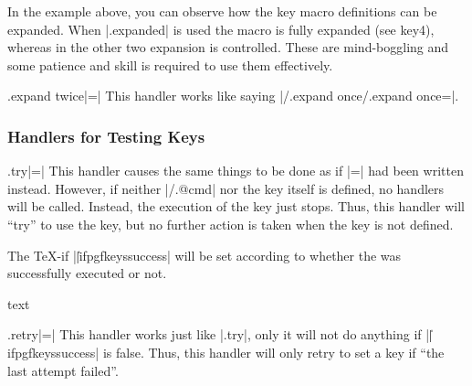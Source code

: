 In the example above, you can observe how the key macro definitions can be expanded. When |.expanded| is used
the macro is fully expanded (see key4), whereas in the other two expansion is controlled. These are mind-boggling and some patience and skill is required to use them effectively.


\begin{handler}{.expand twice}{|=|}
  This handler works like saying |/.expand once/.expand once=|.
\end{handler}





\subsubsection{Handlers for Testing Keys}

\begin{handler}{.try}{|=|}
  This handler causes the same things to be done as if
  |=| had been written instead. However, if
  neither |/.@cmd| nor the key itself is defined, no
  handlers will be called. Instead, 
  the execution of the key just stops. Thus, this handler will ``try''
  to use the key, but no further action is taken when the key is not
  defined.

  The \TeX-if |\||ifpgfkeyssuccess| will be set according to whether
  the  was successfully executed or not. 
\end{handler}  
\begin{codeexample}[]
 text
\end{codeexample}


\begin{handler}{.retry}{|=|}
  This handler works just like |.try|, only it will not do anything if
  |\||ifpgfkeyssuccess| is false. Thus, this handler will only retry
  to set a key if ``the last attempt failed''. 
\end{handler}  
\begin{codeexample}[]
\end{codeexample}



